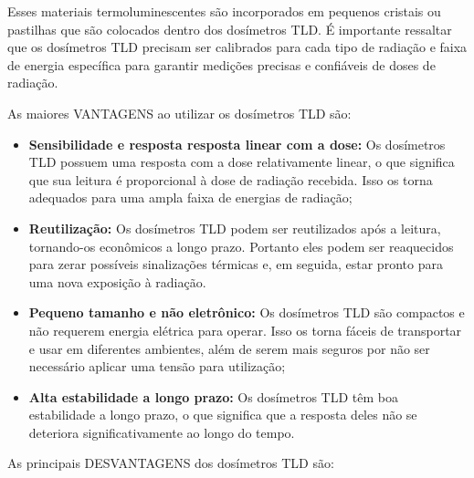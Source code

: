 \documentclass[11pt,a4paper]{article}
\begin{document}
		Esses materiais termoluminescentes são incorporados em pequenos cristais ou pastilhas que são colocados dentro dos dosímetros TLD. É importante ressaltar que os dosímetros TLD precisam ser calibrados para cada tipo de radiação e faixa de energia específica para garantir medições precisas e confiáveis de doses de radiação.

		As maiores \textcolor{CarnationPink}{VANTAGENS} ao utilizar os dosímetros TLD são:

		\begin{itemize}[label=\textcolor{CarnationPink}{$\blacktriangleright$}]
			\item \textbf{Sensibilidade e resposta resposta linear com a dose: } Os dosímetros TLD possuem uma resposta com a dose relativamente linear, o que significa que sua leitura é proporcional à dose de radiação recebida. Isso os torna adequados para uma ampla faixa de energias de radiação;
			\item \textbf{Reutilização: } Os dosímetros TLD podem ser reutilizados após a leitura, tornando-os econômicos a longo prazo. Portanto eles podem ser reaquecidos para zerar possíveis sinalizações térmicas e, em seguida, estar pronto para uma nova exposição à radiação.
			\item \textbf{Pequeno tamanho e não eletrônico:} Os dosímetros TLD são compactos e não requerem energia elétrica para operar. Isso os torna fáceis de transportar e usar em diferentes ambientes, além de serem mais seguros por não ser necessário aplicar uma tensão para utilização;
			\item \textbf{Alta estabilidade a longo prazo:} Os dosímetros TLD têm boa estabilidade a longo prazo, o que significa que a resposta deles não se deteriora significativamente ao longo do tempo.
		\end{itemize}

		As principais \textcolor{CarnationPink}{DESVANTAGENS} dos dosímetros TLD são:
\end{document}
